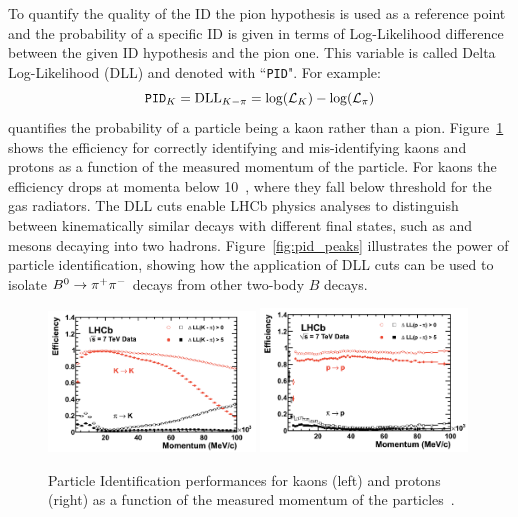 To quantify the quality of the ID the pion hypothesis is used as a reference point and the probability
of a specific ID is given in terms of  Log-Likelihood difference between the given ID hypothesis and the pion one.
This variable is called Delta Log-Likelihood (DLL) and denoted with ``\verb!PID!".
For example:
\begin{equation}
\verb!PID!_K = \text{DLL}_{K-\pi} = \log(\mathcal{L}_K) - \log(\mathcal{L}_\pi)
\end{equation}
quantifies the probability of a particle being a kaon rather than a pion.
Figure~\ref{fig:pid_perf} shows the efficiency for correctly identifying and mis-identifying kaons and protons
as a function of the measured momentum of the particle. For kaons the efficiency drops at momenta below
10~\gev, where they fall below threshold for the gas radiators. 
The DLL cuts enable LHCb physics analyses to distinguish between kinematically similar decays 
with different final states, such as \Bz and \Bs mesons decaying into two hadrons.
Figure~\ref{fig:pid_peaks} illustrates the power of particle identification,  showing how the application
of DLL cuts can be used to isolate $\Bz\to \pi^+\pi^-$ decays from other two-body $B$ decays.
%
\begin{figure}[h!]
\centering
\includegraphics[width=0.49\textwidth]{Detector/figs/kaon_pid_perf.png}
\includegraphics[width=0.49\textwidth]{Detector/figs/proton_pid_perf.png}
\caption{Particle Identification performances for kaons (left) and protons (right) as a function
of the measured momentum of the particles~\cite{Alves:2008zz}. }
\label{fig:pid_perf}
\end{figure}

